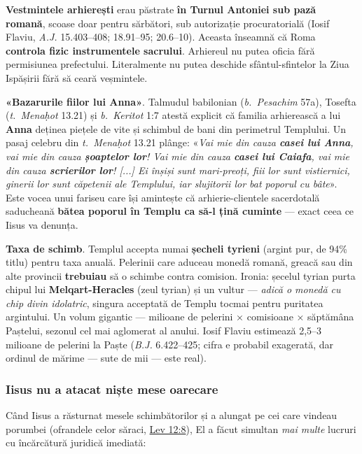 \documentclass[12pt,a4paper,twoside,openany]{book}
\begin{document}
\textbf{Vestmintele arhierești} erau păstrate \textbf{în Turnul Antoniei sub pază romană}, scoase doar pentru sărbători, sub autorizație procuratorială (Iosif Flaviu, \textit{A.J.} 15.403--408; 18.91--95; 20.6--10). Aceasta înseamnă că Roma \textbf{controla fizic instrumentele sacrului}. Arhiereul nu putea oficia fără permisiunea prefectului. Literalmente nu putea deschide sfântul-sfintelor la Ziua Ispășirii fără să ceară veșmintele.

\textbf{«Bazarurile fiilor lui Anna»}. Talmudul babilonian (\textit{b.\ Pesachim} 57a), Tosefta (\textit{t.\ Menaḥot} 13.21) și \textit{b.\ Keritot} 1:7 atestă explicit că familia arhierească a lui \textbf{Anna} deținea piețele de vite și schimbul de bani din perimetrul Templului. Un pasaj celebru din \textit{t.\ Menaḥot} 13.21 plânge: «\textit{Vai mie din cauza \textbf{casei lui Anna}, vai mie din cauza \textbf{șoaptelor lor}! Vai mie din cauza \textbf{casei lui Caiafa}, vai mie din cauza \textbf{scrierilor lor}! [...] Ei înșiși sunt mari-preoți, fiii lor sunt vistiernici, ginerii lor sunt căpetenii ale Templului, iar slujitorii lor bat poporul cu bâte}». Este vocea unui fariseu care își amintește că arhierie-clientele sacerdotală saducheană \textbf{bătea poporul în Templu ca să-l țină cuminte} — exact ceea ce Iisus va denunța.

\textbf{Taxa de schimb}. Templul accepta numai \textbf{șecheli tyrieni} (argint pur, de 94\% titlu) pentru taxa anuală. Pelerinii care aduceau monedă romană, greacă sau din alte provincii \textbf{trebuiau} să o schimbe contra comision. Ironia: șecelul tyrian purta chipul lui \textbf{Melqart-Heracles} (zeul tyrian) și un vultur — \textit{adică o monedă cu chip divin idolatric}, singura acceptată de Templu tocmai pentru puritatea argintului. Un volum gigantic — milioane de pelerini × comisioane × săptămâna Paștelui, sezonul cel mai aglomerat al anului. Iosif Flaviu estimează 2,5--3 milioane de pelerini la Paște (\textit{B.J.} 6.422--425; cifra e probabil exagerată, dar ordinul de mărime — sute de mii — este real).

\subsubsection*{Iisus nu a atacat niște mese oarecare}

Când Iisus a răsturnat mesele schimbătorilor și a alungat pe cei care vindeau porumbei (ofrandele celor săraci, \href{https://bibliaortodoxa.ro/carte.php?id=3\&cap=12\#8}{Lev 12:8}), El a făcut simultan \textit{mai multe} lucruri cu încărcătură juridică imediată:
\end{document}
